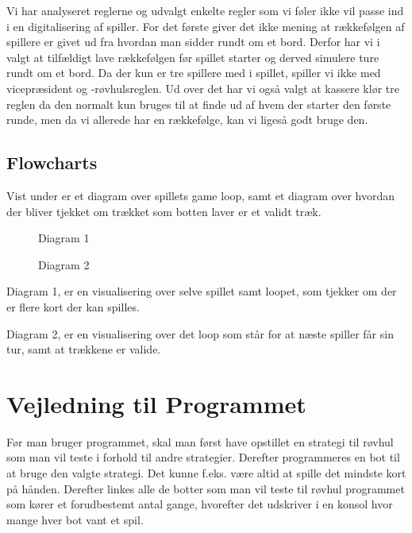 \documentclass[a4paper, 12pt]{article}
\begin{document}
\begin{multicols}{2}
Vi har analyseret reglerne og udvalgt enkelte regler som vi føler ikke vil passe ind i en digitalisering af spiller. For det første giver det ikke mening at rækkefølgen af spillere er givet ud fra hvordan man sidder rundt om et bord. Derfor har vi i valgt at tilfældigt lave rækkefølgen før spillet starter og derved simulere ture rundt om et bord. Da der kun er tre spillere med i spillet, spiller vi ikke med vicepræsident og -røvhulsreglen.
Ud over det har vi også valgt at kassere klør tre reglen da den normalt kun bruges til at finde ud af hvem der starter den første runde, men da vi allerede har en rækkefølge, kan vi ligeså godt bruge den.

\vfill
\pagebreak

\subsection{Flowcharts}
Vist under er et diagram over spillets game loop, samt et diagram over hvordan der bliver tjekket om trækket som botten laver er et validt træk.
\begin{figure}[H]
    \centering
    \resizebox{.5\linewidth}{!}{}
    \caption{Diagram 1}
\end{figure}

\begin{figure}[H]
    \centering
    \resizebox{.5\linewidth}{!}{}
    \caption{Diagram 2}
\end{figure}

Diagram 1, er en visualisering over selve spillet samt loopet, som tjekker om der er flere kort der kan spilles.
\bigbreak

Diagram 2, er en visualisering over det loop som står for at næste spiller får sin tur, samt at trækkene er valide.

\vfill
\pagebreak
\section{Vejledning til Programmet}

Før man bruger programmet, skal man først have opstillet en strategi til røvhul som man vil teste i forhold til andre strategier. Derefter programmeres en bot til at bruge den valgte strategi. Det kunne f.eks. være altid at spille det mindste kort på hånden. Derefter linkes alle de botter som man vil teste til røvhul programmet som kører et forudbestemt antal gange, hvorefter det udskriver i en konsol hvor mange hver bot vant et spil.


\end{multicols}
\end{document}

